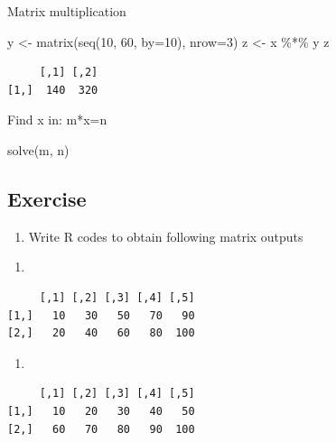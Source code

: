 \documentclass[
  letterpaper,
  DIV=11,
  numbers=noendperiod]{scrreprt}
\newenvironment{Shaded}{\begin{snugshade}}{\end{snugshade}}
\newcommand{\AttributeTok}[1]{\textcolor[rgb]{0.40,0.45,0.13}{#1}}
\newcommand{\DecValTok}[1]{\textcolor[rgb]{0.68,0.00,0.00}{#1}}
\newcommand{\FunctionTok}[1]{\textcolor[rgb]{0.28,0.35,0.67}{#1}}
\newcommand{\NormalTok}[1]{\textcolor[rgb]{0.00,0.23,0.31}{#1}}
\newcommand{\OtherTok}[1]{\textcolor[rgb]{0.00,0.23,0.31}{#1}}
\newcommand{\SpecialCharTok}[1]{\textcolor[rgb]{0.37,0.37,0.37}{#1}}
\providecommand{\tightlist}{%
  \setlength{\itemsep}{0pt}\setlength{\parskip}{0pt}}\usepackage{longtable,booktabs,array}
\begin{document}
Matrix multiplication

\begin{Shaded}
\begin{Highlighting}[]
\NormalTok{y }\OtherTok{\textless{}{-}} \FunctionTok{matrix}\NormalTok{(}\FunctionTok{seq}\NormalTok{(}\DecValTok{10}\NormalTok{, }\DecValTok{60}\NormalTok{, }\AttributeTok{by=}\DecValTok{10}\NormalTok{), }\AttributeTok{nrow=}\DecValTok{3}\NormalTok{)}
\NormalTok{z }\OtherTok{\textless{}{-}}\NormalTok{ x }\SpecialCharTok{\%*\%}\NormalTok{ y}
\NormalTok{z}
\end{Highlighting}
\end{Shaded}

\begin{verbatim}
     [,1] [,2]
[1,]  140  320
\end{verbatim}

Find x in: m*x=n

\begin{Shaded}
\begin{Highlighting}[]
\FunctionTok{solve}\NormalTok{(m, n)}
\end{Highlighting}
\end{Shaded}

\subsection{Exercise}\label{exercise-2}

\begin{enumerate}
\def\labelenumi{\roman{enumi}.}
\tightlist
\item
  Write R codes to obtain following matrix outputs
\end{enumerate}

\begin{enumerate}
\def\labelenumi{\alph{enumi}.}
\tightlist
\item
\end{enumerate}

\begin{verbatim}
     [,1] [,2] [,3] [,4] [,5]
[1,]   10   30   50   70   90
[2,]   20   40   60   80  100
\end{verbatim}

\begin{enumerate}
\def\labelenumi{\alph{enumi}.}
\setcounter{enumi}{1}
\tightlist
\item
\end{enumerate}

\begin{verbatim}
     [,1] [,2] [,3] [,4] [,5]
[1,]   10   20   30   40   50
[2,]   60   70   80   90  100
\end{verbatim}
\end{document}
